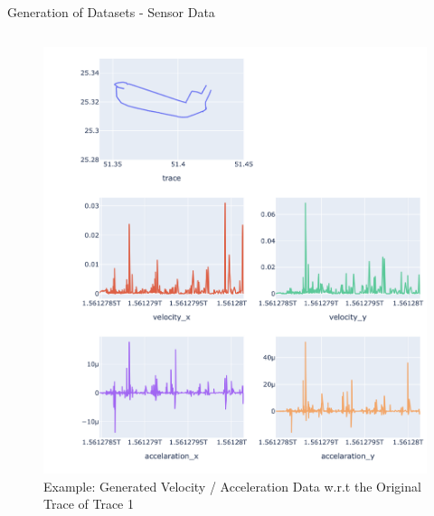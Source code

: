 \documentclass[aspectratio=169, 8pt]{beamer}
\begin{document}
\begin{frame}{Generation of Datasets - Sensor Data}
\begin{columns}[T]
        \begin{column}{0.5\linewidth}
           \begin{figure}
               \centering
               \includegraphics[width=0.7\linewidth]{images/velocity-generation.png}
               \caption{Example: Generated Velocity / Acceleration Data w.r.t the Original Trace of Trace 1}
               \label{fig:enter-label}
           \end{figure}
            
        \end{column}
    \end{columns}
\end{frame}

           

           
            
        



            


\end{document}

